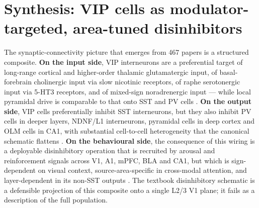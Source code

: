 \documentclass[11pt]{article}
\begin{document}
\section{Synthesis: VIP cells as modulator-targeted, area-tuned disinhibitors}

The synaptic-connectivity picture that emerges from 467 papers is a structured composite. \textbf{On the input side}, VIP interneurons are a preferential target of long-range cortical and higher-order thalamic glutamatergic input, of basal-forebrain cholinergic input via slow nicotinic receptors, of raphe serotonergic input via 5-HT3 receptors, and of mixed-sign noradrenergic input --- while local pyramidal drive is comparable to that onto SST and PV cells \citep{Wall2016, Lee2013, Zhang2014, Williams2019, Anastasiades2021a, Cruikshank2012, Audette2018, Stachniak2023, Bilash2023, Porter1999, Kawaguchi1997b, Kawaguchi1998, Arroyo2012, Fu2014, Ferezou2002, Vucurovic2010, Frazer2017, Letzkus2011}. \textbf{On the output side}, VIP cells preferentially inhibit SST interneurons, but they also inhibit PV cells in deeper layers, NDNF/L1 interneurons, pyramidal cells in deep cortex and OLM cells in CA1, with substantial cell-to-cell heterogeneity that the canonical schematic flattens \citep{Pfeffer2013, Pi2013, Lee2013, Karnani2016a, Karnani2016b, Walker2016, Yu2019, Zhou2017, Anastasiades2021a, Schuman2019, Hafner2021, Tyan2014, Turi2019, Francavilla2018a, Booker2018}. \textbf{On the behavioural side}, the consequence of this wiring is a deployable disinhibitory operation that is recruited by arousal and reinforcement signals across V1, A1, mPFC, BLA and CA1, but which is sign-dependent on visual context, source-area-specific in cross-modal attention, and layer-dependent in its non-SST outputs \citep{Fu2014, Pi2013, Letzkus2011, Krabbe2019, Pakan2016, Dipoppa2018, Sabri2024, Kamigaki2017, Pinto2015, Szadai2022, Tamboli2024, Ibrahim2016, Kaneko2024, Anastasiades2021a}. The textbook disinhibitory schematic is a defensible projection of this composite onto a single L2/3 V1 plane; it fails as a description of the full population.
\end{document}
